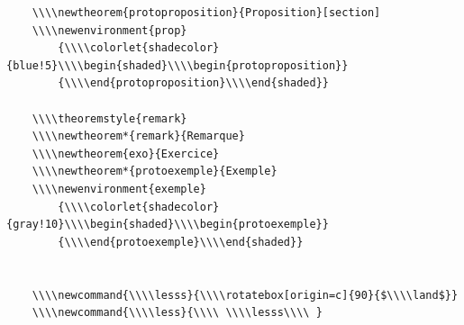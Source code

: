 \documentclass[french]{article}
\theoremstyle{definition}
\newtheorem{protoproposition}{Proposition}[section]
\theoremstyle{remark}
\newtheorem*{protoexemple}{Exemple}
\newcommand{\lesss}{\rotatebox[origin=c]{90}{$\land$}}
\newcommand{\less}{\ \lesss\ }
\begin{document}
\begin{verbatim}
    \\\\newtheorem{protoproposition}{Proposition}[section]
    \\\\newenvironment{prop}
        {\\\\colorlet{shadecolor}{blue!5}\\\\begin{shaded}\\\\begin{protoproposition}}
        {\\\\end{protoproposition}\\\\end{shaded}}

    \\\\theoremstyle{remark}
    \\\\newtheorem*{remark}{Remarque}
    \\\\newtheorem{exo}{Exercice}
    \\\\newtheorem*{protoexemple}{Exemple}
    \\\\newenvironment{exemple}
        {\\\\colorlet{shadecolor}{gray!10}\\\\begin{shaded}\\\\begin{protoexemple}}
        {\\\\end{protoexemple}\\\\end{shaded}}


    \\\\newcommand{\\\\lesss}{\\\\rotatebox[origin=c]{90}{$\\\\land$}}
    \\\\newcommand{\\\\less}{\\\\ \\\\lesss\\\\ }


\end{verbatim}
\end{document}
